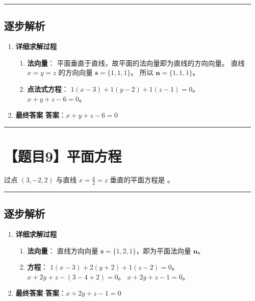 \documentclass[UTF8]{ctexart}
\newenvironment{redenv}{\color{red}}{}
\newenvironment{detailedanalysis}{%
    \color{red}
    \begin{enumerate}[label=\textbf{第\arabic*步：}, leftmargin=*, align=left, itemsep=1.5ex]
}{%
    \end{enumerate}
}
\newcommand{\problemrule}{\noindent\rule{\textwidth}{1.5pt}\vspace{-0.8em}}
\newcommand{\analysisrule}{\noindent\rule{\textwidth}{0.8pt}\vspace{-0.8em}}
\newcommand{\blank}[1]{\underline{\hspace{#1}}}
\begin{document}
\begin{redenv}
\analysisrule
\subsection*{逐步解析}

\begin{detailedanalysis}
\item \textbf{详细求解过程}
\begin{enumerate}[label=(\arabic*)]
\item \textbf{法向量}：
平面垂直于直线，故平面的法向量即为直线的方向向量。
直线 $x=y=z$ 的方向向量 $\mathbf{s} = \{1, 1, 1\}$。
所以 $\mathbf{n} = \{1, 1, 1\}$。
\item \textbf{点法式方程}：
$1(x-3) + 1(y-2) + 1(z-1) = 0$。
$x + y + z - 6 = 0$。
\end{enumerate}

\item \textbf{最终答案}
\textbf{答案}：$ x+y+z-6=0 $
\end{detailedanalysis}
\end{redenv}

\problemrule
\section*{【题目9】平面方程}
过点 $ (3,-2,2) $ 与直线 $ x=\frac{y}{2}=z $ 垂直的平面方程是 \blank{2cm}。

\begin{redenv}
\analysisrule
\subsection*{逐步解析}

\begin{detailedanalysis}
\item \textbf{详细求解过程}
\begin{enumerate}[label=(\arabic*)]
\item \textbf{法向量}：
直线方向向量 $\mathbf{s} = \{1, 2, 1\}$，即为平面法向量 $\mathbf{n}$。
\item \textbf{方程}：
$1(x-3) + 2(y+2) + 1(z-2) = 0$。
$x + 2y + z - (3 - 4 + 2) = 0$。
$x + 2y + z - 1 = 0$。
\end{enumerate}

\item \textbf{最终答案}
\textbf{答案}：$ x+2y+z-1=0 $
\end{detailedanalysis}
\end{redenv}
\end{document}
